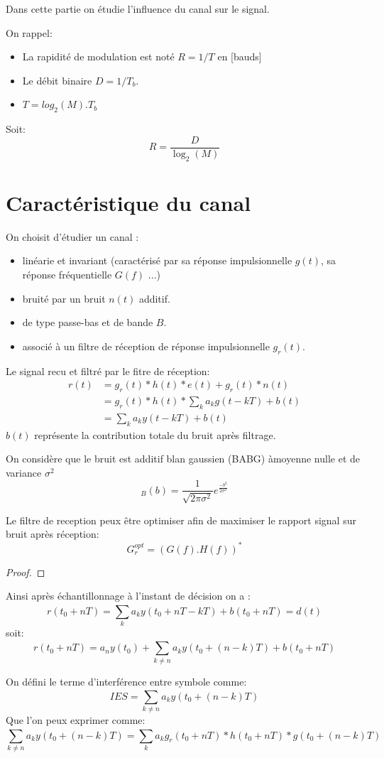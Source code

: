 \documentclass[main.tex]{subfiles}
\begin{document}
Dans cette partie on étudie l'influence du canal sur le signal.
\begin{defin}
  On rappel:
  \begin{itemize}
  \item La rapidité de modulation est noté $R = 1/T$ en [bauds]\\
  \item Le débit binaire $D = 1/T_b$.
  \item $T = log_2(M) .T_b$
  \end{itemize}
  Soit:
  \[
    R = \frac{D}{\log_2(M)}
  \]
\end{defin}

\section{Caractéristique du canal}
\label{sec:carac_canal}
On choisit d'étudier un canal :
\begin{itemize}
\item linéarie et invariant (caractérisé par sa réponse impulsionnelle  $g(t)$, sa réponse fréquentielle $G(f)$ ...)
\item bruité par un bruit $n(t)$ additif.
\item de type passe-bas et de bande $B$.
 \item associé à un filtre de réception de réponse impulsionnelle $g_r(t)$.
\end{itemize}

Le signal recu et filtré par le fitre de réception:
\begin{align*}
  r(t) &= g_r(t) \ast h(t) \ast e(t) + g_r(t)\ast n(t)\\
       &= g_r(t) \ast h(t) \ast \sum_{k}^{}a_kg(t-kT)+ b(t)\\
       &= \sum_{k}^{}a_ky(t-kT)+b(t)
\end{align*}
$b(t)$ représente la contribution totale du bruit après filtrage.

\begin{prop}
  On considère que le bruit est additif blan gaussien (BABG) àmoyenne nulle et de variance $\sigma^2$
  \[_B(b) = \frac{1}{\sqrt{2\pi\sigma^2}}e^{\frac{-b^2}{2\sigma^2}}\]
\end{prop}
\begin{prop}
  Le filtre de reception peux être optimiser afin de maximiser le rapport signal sur bruit après réception:
  \[
    G_r^{opt}=(G(f).H(f))^*
  \]
\end{prop}
\begin{proof}
  
\end{proof}
Ainsi après échantillonnage à l'instant de décision on a :
\[
  r(t_0+nT) = \sum_{k}^{}a_ky(t_0+nT-kT)+b(t_0+nT)= d(t)
\]
soit:
\[
  r(t_0+nT) = a_ny(t_0)+\sum_{k\neq n}^{}a_ky(t_0+(n-k)T)+b(t_0+nT)
\]
\begin{defin}
  On défini le terme d'interférence entre symbole comme:
  \[
IES =  \sum_{k\neq n}^{} a_k y(t_0+(n-k)T)
\]
Que l'on peux exprimer comme:
\[
  \sum_{k\neq n}^{} a_k y(t_0+(n-k)T) = \sum_{k}^{}a_kg_r(t_0+nT)\ast h(t_0+nT)\ast g(t_0+(n-k)T)
\]
\end{defin}
\end{document}
